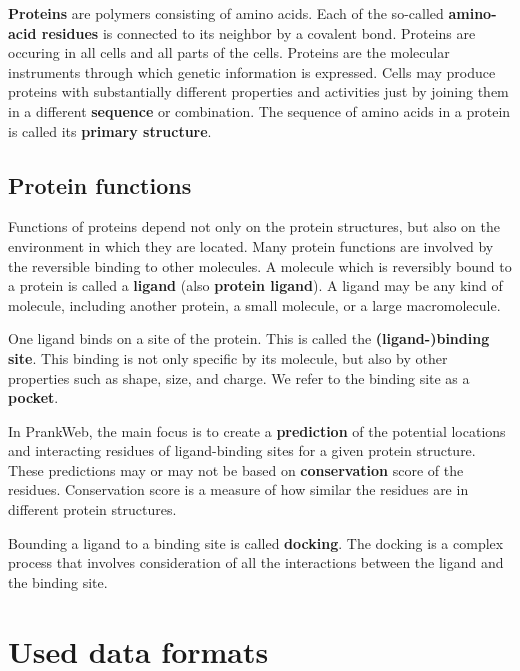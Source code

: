 \textbf{Proteins} are polymers consisting of amino acids. Each of the so-called \textbf{amino-acid residues} is connected to its neighbor by a covalent bond. Proteins are occuring in all cells and all parts of the cells. Proteins are the molecular instruments through which genetic information is expressed. Cells may produce proteins with substantially different properties and activities just by joining them in a different \textbf{sequence} or combination. The sequence of amino acids in a protein is called its \textbf{primary structure}. \cite{nelson2008lehninger}

\subsection{Protein functions}
\label{subsec:protein_functions}

Functions of proteins depend not only on the protein structures, but also on the environment in which they are located. Many protein functions are involved by the reversible binding to other molecules. A molecule which is reversibly bound to a protein is called a \textbf{ligand} (also \textbf{protein ligand}). A ligand may be any kind of molecule, including another protein, a small molecule, or a large macromolecule. 

One ligand binds on a site of the protein. This is called the \textbf{(ligand-)binding site}. This binding is not only specific by its molecule, but also by other properties such as shape, size, and charge. We refer to the binding site as a \textbf{pocket}. \cite{nelson2008lehninger}

In PrankWeb, the main focus is to create a \textbf{prediction} of the potential locations and interacting residues of ligand-binding sites for a given protein structure. These predictions may or may not be based on \textbf{conservation} score of the residues. Conservation score is a measure of how similar the residues are in different protein structures.

Bounding a ligand to a binding site is called \textbf{docking}. The docking is a complex process that involves consideration of all the interactions between the ligand and the binding site. \cite{sulimov2019advances}



\section{Used data formats}
\label{sec:used_data_formats}

